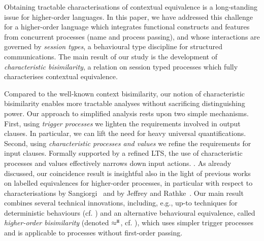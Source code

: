 
Obtaining tractable characterisations of contextual equivalence 
is a long-standing issue for higher-order  languages. 
In this paper, we have addressed this challenge for a higher-order language 
which integrates functional constructs and  features from concurrent processes (name and process passing), and 
whose interactions are governed by \emph{session types}, a behavioural type discipline for structured communications.
The main result of our study is the development of \emph{characteristic bisimilarity}, 
a relation on session typed processes which fully characterises contextual equivalence.

Compared to 
the well-known 
context bisimilarity, our notion of 
characteristic bisimilarity 
enables more tractable analyses without sacrificing distinguishing power. 
Our approach to simplified analysis rests upon two simple mechanisms. 
First, 
using \emph{trigger processes} 
we lighten the requirements %
involved in output clauses. 
In particular, we can lift the need for heavy universal quantifications. 
Second, using \emph{characteristic processes and values} we refine the requirements for input clauses.
Formally supported by a refined LTS, the use of characteristic processes and values effectively narrows down
input actions.
.
As already discussed, our coincidence result is insightful also in the light of previous works on labelled equivalences 
for higher-order processes, in particular with respect to characterisations 
by Sangiorgi~\cite{SangiorgiD:expmpa,San96H} and by Jeffrey and Rathke~\cite{JeffreyR05}. Our main result 
combines several technical innovations, including, e.g., 
up-to techniques for deterministic behaviours (cf. )
and an alternative behavioural equivalence, called \emph{higher-order bisimilarity}
(denoted $\approx^\mathtt{H}$, cf. ), which 
uses simpler trigger processes and 
is applicable to processes without first-order passing. 

